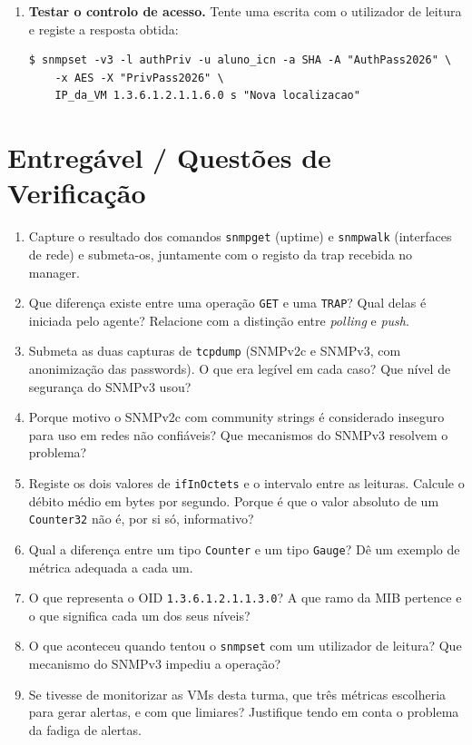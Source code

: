 \documentclass[11pt,a4paper]{article}
\begin{document}
\begin{enumerate}[label=\arabic*.]
  \item \textbf{Testar o controlo de acesso.} Tente uma escrita com o utilizador de leitura e registe a resposta obtida:
\begin{lstlisting}
$ snmpset -v3 -l authPriv -u aluno_icn -a SHA -A "AuthPass2026" \
    -x AES -X "PrivPass2026" \
    IP_da_VM 1.3.6.1.2.1.1.6.0 s "Nova localizacao"
\end{lstlisting}

\end{enumerate}

\section{Entregável / Questões de Verificação}
\begin{enumerate}[label=\alph*)]
  \setlength\itemsep{0.2cm}
  \item Capture o resultado dos comandos \texttt{snmpget} (uptime) e \texttt{snmpwalk} (interfaces de rede) e submeta-os, juntamente com o registo da trap recebida no manager.
  \item Que diferença existe entre uma operação \texttt{GET} e uma \texttt{TRAP}? Qual delas é iniciada pelo agente? Relacione com a distinção entre \emph{polling} e \emph{push}.
  \item Submeta as duas capturas de \texttt{tcpdump} (SNMPv2c e SNMPv3, com anonimização das passwords). O que era legível em cada caso? Que nível de segurança do SNMPv3 usou?
  \item Porque motivo o SNMPv2c com community strings é considerado inseguro para uso em redes não confiáveis? Que mecanismos do SNMPv3 resolvem o problema?
  \item Registe os dois valores de \texttt{ifInOctets} e o intervalo entre as leituras. Calcule o débito médio em bytes por segundo. Porque é que o valor absoluto de um \texttt{Counter32} não é, por si só, informativo?
  \item Qual a diferença entre um tipo \texttt{Counter} e um tipo \texttt{Gauge}? Dê um exemplo de métrica adequada a cada um.
  \item O que representa o OID \texttt{1.3.6.1.2.1.1.3.0}? A que ramo da MIB pertence e o que significa cada um dos seus níveis?
  \item O que aconteceu quando tentou o \texttt{snmpset} com um utilizador de leitura? Que mecanismo do SNMPv3 impediu a operação?
  \item Se tivesse de monitorizar as VMs desta turma, que três métricas escolheria para gerar alertas, e com que limiares? Justifique tendo em conta o problema da fadiga de alertas.
\end{enumerate}
\end{document}
